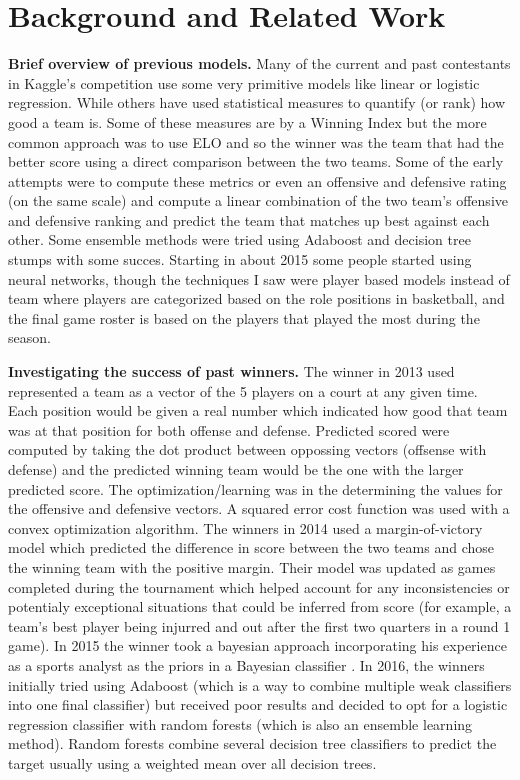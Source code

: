 \documentclass{article} %
\begin{document}
\section{Background and Related Work}
\label{sec:background-related-work}

\textbf{Brief overview of previous models.}  Many of the current and past contestants in Kaggle's competition \citep{kagglecompetition} use some very primitive models like linear or logistic regression.  While others have used statistical measures to quantify (or rank) how good a team is.  Some of these measures are by a Winning Index but the more common approach was to use ELO \citep{elo} and so the winner was the team that had the better score using a direct comparison between the two teams.  Some of the early attempts were to compute these metrics or even an offensive and defensive rating (on the same scale) and compute a linear combination of the two team's offensive and defensive ranking and predict the team that matches up best against each other.  Some ensemble methods were tried using Adaboost and decision tree stumps with some succes.  Starting in about 2015 some people started using neural networks, though the techniques I saw were player based models instead of team where players are categorized based on the role positions in basketball, and the final game roster is based on the players that played the most during the season.

\textbf{Investigating the success of past winners.}  The winner in 2013 used represented a team as a vector of the 5 players on a court at any given time.  Each position would be given a real number which indicated how good that team was at that position for both offense and defense.  Predicted scored were computed by taking the dot product between oppossing vectors (offsense with defense) and the predicted winning team would be the one with the larger predicted score.   The optimization/learning was in the determining the values for the offensive and defensive vectors.  A squared error cost function was used with a convex optimization algorithm.  The winners in 2014 used a margin-of-victory model which predicted the difference in score between the two teams and chose the winning team with the positive margin.  Their model was updated as games completed during the tournament which helped account for any inconsistencies or potentialy exceptional situations that could be inferred from score (for example, a team's best player being injurred and out after the first two quarters in a round 1 game).  In 2015 the winner took a bayesian approach incorporating his experience as a sports analyst as the priors in a Bayesian classifier \citep{kaggle2015winner}.  In 2016, the winners initially tried using Adaboost (which is a way to combine multiple weak classifiers into one final classifier) but received poor results \citep{kaggle2016winner} and decided to opt for a logistic regression classifier with random forests (which is also an ensemble learning method).  Random forests combine several decision tree classifiers to predict the target usually using a weighted mean over all decision trees.
\end{document}
